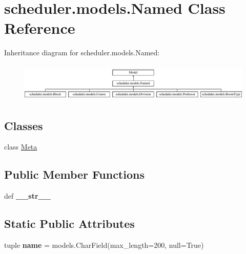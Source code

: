 \hypertarget{classscheduler_1_1models_1_1_named}{\section{scheduler.\-models.\-Named Class Reference}
\label{classscheduler_1_1models_1_1_named}
}
Inheritance diagram for scheduler.\-models.\-Named\-:\begin{figure}[H]
\begin{center}
\leavevmode
\includegraphics[height=1.846154cm]{classscheduler_1_1models_1_1_named}
\end{center}
\end{figure}
\subsection*{Classes}
\begin{DoxyCompactItemize}
\item 
class \hyperlink{classscheduler_1_1models_1_1_named_1_1_meta}{Meta}
\end{DoxyCompactItemize}
\subsection*{Public Member Functions}
\begin{DoxyCompactItemize}
\item 
\hypertarget{classscheduler_1_1models_1_1_named_a37b97c2fa4acbf5c61ca4cdff1410d47}{def {\bfseries \-\_\-\-\_\-str\-\_\-\-\_\-}}\label{classscheduler_1_1models_1_1_named_a37b97c2fa4acbf5c61ca4cdff1410d47}

\end{DoxyCompactItemize}
\subsection*{Static Public Attributes}
\begin{DoxyCompactItemize}
\item 
\hypertarget{classscheduler_1_1models_1_1_named_a5e5e18340ced82b633c6c913447d602f}{tuple {\bfseries name} = models.\-Char\-Field(max\-\_\-length=200, null=True)}\label{classscheduler_1_1models_1_1_named_a5e5e18340ced82b633c6c913447d602f}

\end{DoxyCompactItemize}


